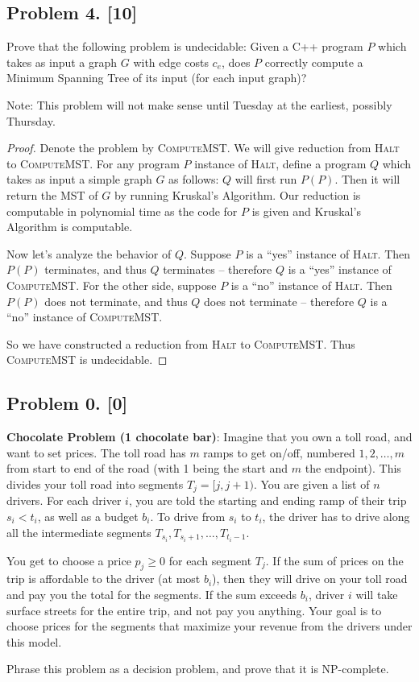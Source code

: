 \documentclass[10pt]{article}
\begin{document}
\subsection*{Problem 4. [10]}
  Prove that the following problem is undecidable: Given a C++ program $P$ which takes as input a graph $G$ with edge costs $c_e$, does $P$ correctly compute a Minimum Spanning Tree of its input (for each input graph)?

  Note: This problem will not make sense until Tuesday at the earliest, possibly Thursday.

\begin{proof}
  Denote the problem by \textsc{ComputeMST}. We will give  reduction from \textsc{Halt} to \textsc{ComputeMST}. For any program \(P\) instance of \textsc{Halt}, define a program \(Q\) which takes as input a simple graph \(G\) as follows: \(Q\) will first run \(P(P)\). Then it will return the MST of \(G\) by running Kruskal's Algorithm. Our reduction is computable in polynomial time as the code for \(P\) is given and Kruskal's Algorithm is computable.

  Now let's analyze the behavior of \(Q\). Suppose \(P\) is a ``yes'' instance of \textsc{Halt}. Then \(P(P)\) terminates, and thus \(Q\) terminates -- therefore \(Q\) is a ``yes'' instance of \textsc{ComputeMST}. For the other side, suppose \(P\) is a ``no'' instance of \textsc{Halt}. Then \(P(P)\) does not terminate, and thus \(Q\) does not terminate -- therefore \(Q\) is a ``no'' instance of \textsc{ComputeMST}.

  So we have constructed a reduction from \textsc{Halt} to \textsc{ComputeMST}. Thus \textsc{ComputeMST} is undecidable.
\end{proof}

\subsection*{Problem 0. [0]}
\textbf{Chocolate Problem (1 chocolate bar)}: 
Imagine that you own a toll road, and want to set prices.
The toll road has $m$ ramps to get on/off, numbered $1, 2, \ldots, m$ from start to end of the road (with 1 being the start and $m$ the endpoint).
This divides your toll road into segments $T_j = [j,j+1)$.
You are given a list of $n$ drivers.
For each driver $i$, you are told the starting and ending ramp of their trip $s_i < t_i$, as well as a budget $b_i$. 
To drive from $s_i$ to $t_i$, the driver has to drive along all the intermediate segments $T_{s_i}, T_{s_i+1}, \ldots, T_{t_i-1}$.

You get to choose a price $p_j \geq 0$ for each segment $T_j$.
If the sum of prices on the trip is affordable to the driver (at most $b_i$), then they will drive on your toll road and pay you the total for the segments.
If the sum exceeds $b_i$, driver $i$ will take surface streets for the entire trip, and not pay you anything.
Your goal is to choose prices for the segments that maximize your revenue from the drivers under this model.

Phrase this problem as a decision problem, and prove that it is NP-complete. 
\end{document}
